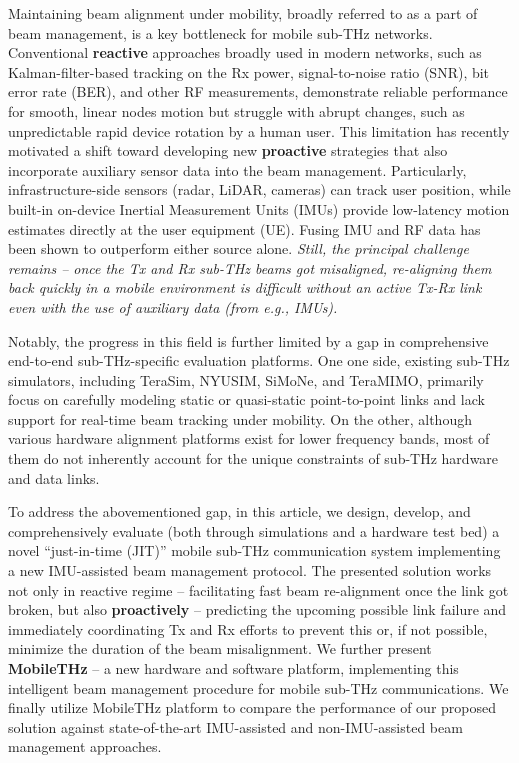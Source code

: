 \documentclass[fleqn,10pt]{wlscirep}
\begin{document}
Maintaining beam alignment under mobility, broadly referred to as a part of beam management, is a key bottleneck for mobile sub-THz networks\cite{Giordani2018ATO, 10422712, Wang2022}. Conventional \textbf{reactive} approaches broadly used in modern networks, such as Kalman-filter-based tracking on the Rx power, signal-to-noise ratio (SNR), bit error rate (BER), and other RF measurements\cite{8455289,9145366,10067030, 10123123}, demonstrate reliable performance for smooth, linear nodes motion but struggle with abrupt changes, such as unpredictable rapid device rotation by a human user\cite{Wang2022}. This limitation has recently motivated a shift toward developing new \textbf{proactive} strategies that also incorporate auxiliary sensor data into the beam management\cite{10494372, Azari2022, Nokia2022, Chen2023, Jornet2023}. Particularly, infrastructure-side sensors (radar, LiDAR, cameras) can track user position\cite{10422712,5GPPP_Automotive_Vision_2015}, while built-in on-device Inertial Measurement Units (IMUs) provide low-latency motion estimates directly at the user equipment (UE). Fusing IMU and RF data has been shown to outperform either source alone\cite{10036372,9391649,electronics8020142, s21082723, 9814507}. \emph{Still, the principal challenge remains -- once the Tx and Rx sub-THz beams got misaligned, re-aligning them back quickly in a mobile environment is difficult without an active Tx-Rx link even with the use of auxiliary data (from e.g., IMUs).}

Notably, the progress in this field is further limited by a gap in comprehensive end-to-end sub-THz-specific evaluation platforms. One one side, existing sub-THz simulators, including TeraSim\cite{HOSSAIN2019100004}, NYUSIM\cite{10367974}, SiMoNe\cite{rose2015simone, eckhardt2022modular}, and TeraMIMO\cite{tarboush2021teramimo, bodet2023directional}, primarily focus on carefully modeling static or quasi-static point-to-point links and lack support for real-time beam tracking under mobility\cite{Petrov2023Mobile}. On the other, although various hardware alignment platforms exist for lower frequency bands\cite{Abdulwahab2020, Keshavamurthy2022, AlAkkoumi2008}, most of them do not inherently account for the unique constraints of sub-THz hardware and data links.

To address the abovementioned gap, in this article, we design, develop, and comprehensively evaluate (both through simulations and a hardware test bed) a novel ``just-in-time (JIT)'' mobile sub-THz communication system implementing a new IMU-assisted beam management protocol. The presented solution works not only in reactive regime -- facilitating fast beam re-alignment once the link got broken, but also \textbf{proactively} -- predicting the upcoming possible link failure and immediately coordinating Tx and Rx efforts to prevent this or, if not possible, minimize the duration of the beam misalignment. We further present \textbf{MobileTHz} -- a new hardware and software platform, implementing this intelligent beam management procedure for mobile sub-THz communications. We finally utilize MobileTHz platform to compare the performance of our proposed solution against state-of-the-art IMU-assisted and non-IMU-assisted beam management approaches.
\end{document}
